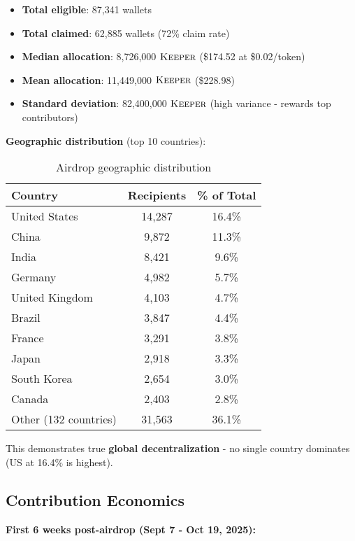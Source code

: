 \documentclass[11pt,letterpaper]{article}
\theoremstyle{definition}
\theoremstyle{remark}
\newcommand{\KEEPER}{\textsc{Keeper}}
\begin{document}
\begin{itemize}
\item \textbf{Total eligible}: 87,341 wallets
\item \textbf{Total claimed}: 62,885 wallets (72\% claim rate)
\item \textbf{Median allocation}: 8,726,000 $\KEEPER$ (\$174.52 at \$0.02/token)
\item \textbf{Mean allocation}: 11,449,000 $\KEEPER$ (\$228.98)
\item \textbf{Standard deviation}: 82,400,000 $\KEEPER$ (high variance - rewards top contributors)
\end{itemize}

\textbf{Geographic distribution} (top 10 countries):

\begin{table}[h]
\centering
\begin{tabular}{lcc}
\toprule
\textbf{Country} & \textbf{Recipients} & \textbf{\% of Total} \\
\midrule
United States & 14,287 & 16.4\% \\
China & 9,872 & 11.3\% \\
India & 8,421 & 9.6\% \\
Germany & 4,982 & 5.7\% \\
United Kingdom & 4,103 & 4.7\% \\
Brazil & 3,847 & 4.4\% \\
France & 3,291 & 3.8\% \\
Japan & 2,918 & 3.3\% \\
South Korea & 2,654 & 3.0\% \\
Canada & 2,403 & 2.8\% \\
Other (132 countries) & 31,563 & 36.1\% \\
\bottomrule
\end{tabular}
\caption{Airdrop geographic distribution}
\label{tab:geography}
\end{table}

This demonstrates true \textbf{global decentralization} - no single country dominates (US at 16.4\% is highest).

\subsection{Contribution Economics}

\textbf{First 6 weeks post-airdrop (Sept 7 - Oct 19, 2025):}
\end{document}
